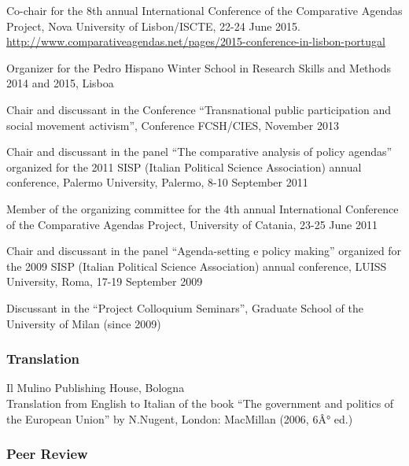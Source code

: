\documentclass[11pt,]{article}
\providecommand{\tightlist}{%
  \setlength{\itemsep}{0pt}\setlength{\parskip}{0pt}}
\renewenvironment{itemize}{
  \begin{list}{}{
    \setlength{\leftmargin}{1.5em}
  }
}{
  \end{list}
}
\begin{document}
\begin{itemize}
\item
  Co-chair for the 8th annual International Conference of the
  Comparative Agendas Project, Nova University of Lisbon/ISCTE, 22-24
  June 2015.
  \url{http://www.comparativeagendas.net/pages/2015-conference-in-lisbon-portugal}
\item
  Organizer for the Pedro Hispano Winter School in Research Skills and
  Methods 2014 and 2015, Lisboa
\item
  Chair and discussant in the Conference ``Transnational public
  participation and social movement activism'', Conference FCSH/CIES,
  November 2013
\item
  Chair and discussant in the panel ``The comparative analysis of policy
  agendas'' organized for the 2011 SISP (Italian Political Science
  Association) annual conference, Palermo University, Palermo, 8-10
  September 2011
\item
  Member of the organizing committee for the 4th annual International
  Conference of the Comparative Agendas Project, University of Catania,
  23-25 June 2011
\item
  Chair and discussant in the panel ``Agenda-setting e policy making''
  organized for the 2009 SISP (Italian Political Science Association)
  annual conference, LUISS University, Roma, 17-19 September 2009
\item
  Discussant in the ``Project Colloquium Seminars'', Graduate School of
  the University of Milan (since 2009)
\end{itemize}

\hypertarget{translation}{%
\subsubsection{Translation}\label{translation}}

\begin{itemize}
\tightlist
\item
  Il Mulino Publishing House, Bologna\\
  Translation from English to Italian of the book ``The government and
  politics of the European Union'' by N.Nugent, London: MacMillan (2006,
  6Â° ed.)
\end{itemize}

\hypertarget{peer-review}{%
\subsubsection{Peer Review}\label{peer-review}}
\end{document}
